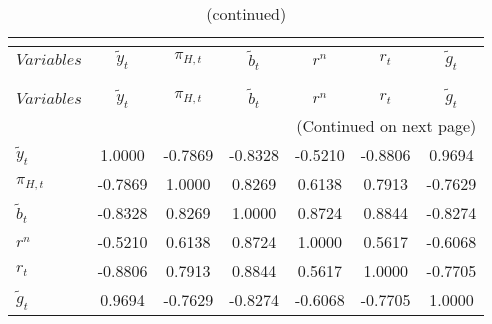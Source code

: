  
\begin{center}
\begin{longtable}{lcccccc} 
\caption{MATRIX OF CORRELATIONS}\\
 \label{Table:th_corr_matrix}\\
\toprule 
$Variables        $	 & 	 $   {\tilde{y}_{t}}$	 & 	 $       {\pi_{H,t}}$	 & 	 $     \tilde{b}_{t}$	 & 	 $            {r^{n}}$	 & 	 $            {r_{t}}$	 & 	 $     \tilde{g}_{t}$\\
\midrule \endfirsthead 
\caption{(continued)}\\
 \toprule \\ 
$Variables        $	 & 	 $   {\tilde{y}_{t}}$	 & 	 $       {\pi_{H,t}}$	 & 	 $     \tilde{b}_{t}$	 & 	 $            {r^{n}}$	 & 	 $            {r_{t}}$	 & 	 $     \tilde{g}_{t}$\\
\midrule \endhead 
\midrule \multicolumn{7}{r}{(Continued on next page)} \\ \bottomrule \endfoot 
\bottomrule \endlastfoot 
${\tilde{y}_{t}}  $	 & 	             1.0000	 & 	            -0.7869	 & 	            -0.8328	 & 	            -0.5210	 & 	            -0.8806	 & 	             0.9694 \\ 
${\pi_{H,t}}      $	 & 	            -0.7869	 & 	             1.0000	 & 	             0.8269	 & 	             0.6138	 & 	             0.7913	 & 	            -0.7629 \\ 
$\tilde{b}_{t}    $	 & 	            -0.8328	 & 	             0.8269	 & 	             1.0000	 & 	             0.8724	 & 	             0.8844	 & 	            -0.8274 \\ 
${r^{n}}          $	 & 	            -0.5210	 & 	             0.6138	 & 	             0.8724	 & 	             1.0000	 & 	             0.5617	 & 	            -0.6068 \\ 
${r_{t}}          $	 & 	            -0.8806	 & 	             0.7913	 & 	             0.8844	 & 	             0.5617	 & 	             1.0000	 & 	            -0.7705 \\ 
$\tilde{g}_{t}    $	 & 	             0.9694	 & 	            -0.7629	 & 	            -0.8274	 & 	            -0.6068	 & 	            -0.7705	 & 	             1.0000 \\ 
\end{longtable}
 \end{center}
